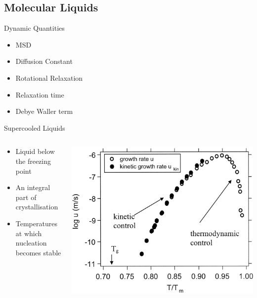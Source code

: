 \documentclass[16pt, aspectratio=43,compress]{beamer}
\begin{document}

\subsection{Molecular Liquids}

\begin{frame}{Dynamic Quantities}
    \begin{itemize}
        \item MSD
        \item Diffusion Constant
        \item Rotational Relaxation
        \item Relaxation time
        \item Debye Waller term
    \end{itemize}
\end{frame}

\begin{frame}{Supercooled Liquids}
    \begin{columns}
        \begin{column}{0.5\linewidth}
            \begin{itemize}
                \item Liquid below the freezing point
                \item An integral part of crystallisation
                \item Temperatures at which nucleation becomes stable
            \end{itemize}
        \end{column}
        \begin{column}{0.5\linewidth}
            \includegraphics[width=\textwidth]{crystal-growth}
        \end{column}
    \end{columns}
\end{frame}
\end{document}
